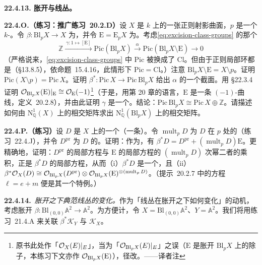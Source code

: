 \textbf{22.4.13. 胀开与线丛。}

\textbf{22.4.O.（练习：推广\mbox{练习~20.2.D}）}\quad 设 $X$ 是 $k$ 上的一张正则射影曲面，$p$ 是一个 $k$-\trValuedPoint。令 $\beta\colon\mathrm{Bl}_pX\to X$ 为\trBlowup{}\trMorphism，并令 $\mathrm{E}=\mathrm{E}_pX$ 为\trExceptionalDivisor。考虑\eqref{eq:excision-class-groups} 的那个\trExactSequence
\[
\mathbb{Z}\mathrel{\xrightarrow{\ \gamma\colon 1\mapsto[\mathrm{E}]\ }}\mathrm{Pic}(\mathrm{Bl}_pX)\mathrel{\xrightarrow{\ \alpha\ }}\mathrm{Pic}(\mathrm{Bl}_pX\setminus\mathrm{E})\longrightarrow 0
\]
（严格说来，\eqref{eq:excision-class-groups} 中 $\mathrm{Pic}$ 被换成了 $\mathrm{Cl}$。但由于正则局部环都是\trUFD{}（\S13.8.5），依\mbox{命题~15.4.16}，此情形下 $\mathrm{Pic}=\mathrm{Cl}$。）注意 $\mathrm{Bl}_pX\setminus\mathrm{E}=X\setminus p$。证明 $\mathrm{Pic}(X\setminus p)=\mathrm{Pic}\,X$。证明 $\beta^*\colon\mathrm{Pic}\,X\to\mathrm{Pic}\,\mathrm{Bl}_pX$ 给出 $\alpha$ 的一个截面。用 \S22.3.4 证明 $\mathcal{O}_{\mathrm{Bl}_pX}(\mathrm{E})|_{\mathrm{E}}\cong\mathcal{O}_{\mathrm{E}}(-1)$\footnote{原书此处作「$\mathcal{O}_X(E)|_E$」，当为「$\mathcal{O}_{\mathrm{Bl}_pX}(E)|_E$」之误（$\mathrm{E}$ 是胀开 $\mathrm{Bl}_pX$ 上的除子，本练习下文亦作 $\mathcal{O}_{\mathrm{Bl}_pX}(\mathrm{E})$），径改。——译者注}（于是，用第 20 章的语言，$\mathrm{E}$ 是一条 $(-1)$-曲线，\mbox{定义~20.2.8}），并由此证明 $\gamma$ 是一个\trInjection。结论：$\mathrm{Pic}\,\mathrm{Bl}_pX\cong\mathrm{Pic}\,X\oplus\mathbb{Z}$。请描述如何由 $\mathrm{N}^1_{\mathbb{Q}}(X)$ 上的相交矩阵求出 $\mathrm{N}^1_{\mathbb{Q}}(\mathrm{Bl}_pX)$ 上的相交矩阵。

\textbf{22.4.P.（练习）}\quad 设 $D$ 是 $X$ 上的一个\trEffectiveCartierDivisor{}（一条\trCurve）。令 $\operatorname{mult}_pD$ 为 $D$ 在 $p$ 处的\trMultiplicity{}（\mbox{练习~22.4.J}），并令 $D^{\mathrm{pr}}$ 为 $D$ 的\trProperTransform。证明：作为\trEffectiveCartierDivisor，有 $\beta^*D=D^{\mathrm{pr}}+(\operatorname{mult}_pD)\mathrm{E}$。更精确地，证明：$D^{\mathrm{pr}}$ 的局部方程与 $\mathrm{E}$ 的局部方程的 $(\operatorname{mult}_pD)$ 次幂二者的乘积，正是 $\beta^*D$ 的局部方程，从而（i）$\beta^*D$ 是一个\trEffectiveCartierDivisor，且（ii）$\beta^*\mathcal{O}_X(D)\cong\mathcal{O}_{\mathrm{Bl}_pX}(D^{\mathrm{pr}})\otimes\mathcal{O}_{\mathrm{Bl}_pX}(\mathrm{E})^{\otimes(\operatorname{mult}_pD)}$。（\mbox{提示~20.2.7} 中的方程 $\ell=e+m$ 便是其一个特例。）

\textbf{22.4.14.}\ \emph{胀开之下典范线丛的变化。}\quad 作为「\trCanonical{}线丛在胀开之下如何变化」的动机，考虑胀开 $\beta\colon\mathrm{Bl}_{(0,0)}\mathbb{A}^2\to\mathbb{A}^2$。为方便计，令 $X=\mathrm{Bl}_{(0,0)}\mathbb{A}^2$、$Y=\mathbb{A}^2$。我们将用\mbox{练习~21.4.A} 来关联 $\beta^*\mathscr{K}_Y$ 与 $\mathscr{K}_X$。

